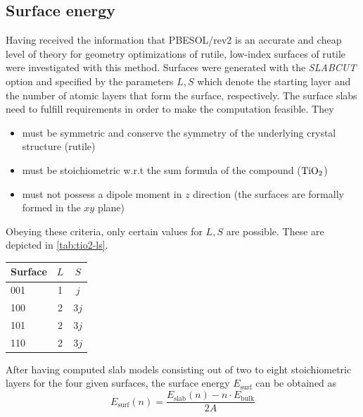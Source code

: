 \documentclass[a4paper,12pt]{scrartcl}
\begin{document}
\subsection{Surface energy}
%
Having received the information that PBESOL/rev2 is an accurate and cheap level of theory for geometry optimizations of rutile, low-index surfaces of rutile were investigated with this method. Surfaces were generated with the \textit{SLABCUT} option and specified by the parameters $ L, S $ which denote the starting layer and the number of atomic layers that form the surface, respectively. The surface slabs need to fulfill requirements in order to make the computation feasible. They
%
\begin{itemize}
	\item must be symmetric and conserve the symmetry of the underlying crystal structure (rutile) 
	\item must be stoichiometric w.r.t the sum formula of the compound ($ \ce{TiO2} $) 
	\item must not possess a dipole moment in $ z $ direction (the surfaces are formally formed in the $ xy $ plane)
\end{itemize}
%
Obeying these criteria, only certain values for $ L, S $ are possible. These are depicted in \autoref{tab:tio2-ls}.
%
\begin{table}[H]
	\centering
	\label{tab:tio2-ls}
	\begin{tabular}{lcc}
		\toprule
		Surface & $ L $ & $ S $ \\
		\midrule
		001     & 1 & $j$  \\
		100     & 2 & $3j$    \\
		101     & 2 & $3j$    \\
		110     & 2 & $3j$     \\
		\bottomrule
	\end{tabular}
\end{table}
%
After having computed slab models consisting out of two to eight stoichiometric layers for the four given surfaces, the surface energy $ E_\mathrm{surf} $ can be obtained as
%
\begin{equation}
	E_\mathrm{surf} (n) = \frac{E_\mathrm{slab}(n) - n \cdot E_\mathrm{bulk}}{2A}
\end{equation}
%
\end{document}
